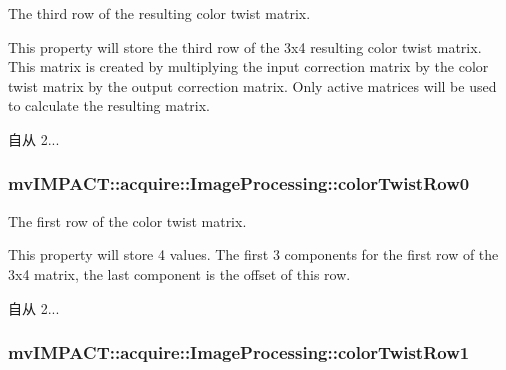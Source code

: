 The third row of the resulting color twist matrix. 

This property will store the third row of the 3x4 resulting color twist matrix. This matrix is created by multiplying the input correction matrix by the color twist matrix by the output correction matrix. Only active matrices will be used to calculate the resulting matrix.

\begin{DoxySince}{自从}
2... 
\end{DoxySince}
\hypertarget{classmv_i_m_p_a_c_t_1_1acquire_1_1_image_processing_a45ac933511a34f20785f092d0758f6b1}{
\subsubsection[{color\+Twist\+Row0}]{ mv\+I\+M\+P\+A\+C\+T\+::acquire\+::\+Image\+Processing\+::color\+Twist\+Row0}}\label{classmv_i_m_p_a_c_t_1_1acquire_1_1_image_processing_a45ac933511a34f20785f092d0758f6b1}


The first row of the color twist matrix. 

This property will store 4 values. The first 3 components for the first row of the 3x4 matrix, the last component is the offset of this row.

\begin{DoxySince}{自从}
2... 
\end{DoxySince}
\hypertarget{classmv_i_m_p_a_c_t_1_1acquire_1_1_image_processing_a95f908912cfd2d3f82978070dacc8dac}{
\subsubsection[{color\+Twist\+Row1}]{ mv\+I\+M\+P\+A\+C\+T\+::acquire\+::\+Image\+Processing\+::color\+Twist\+Row1}}\label{classmv_i_m_p_a_c_t_1_1acquire_1_1_image_processing_a95f908912cfd2d3f82978070dacc8dac}


